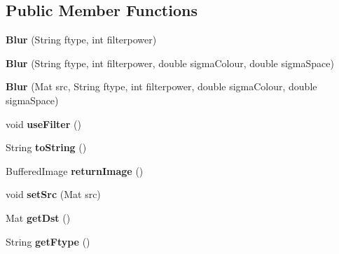 \subsection*{Public Member Functions}
\begin{DoxyCompactItemize}
\item 
\mbox{\label{classapplication_1_1_blur_a11b7920603463fd30f12618d1022caaa}} 
{\bfseries Blur} (String ftype, int filterpower)
\item 
\mbox{\label{classapplication_1_1_blur_afb919280e2244cf0336ab4a07ee847f6}} 
{\bfseries Blur} (String ftype, int filterpower, double sigma\+Colour, double sigma\+Space)
\item 
\mbox{\label{classapplication_1_1_blur_aaff487804568cdfa1f42b3427ecbec14}} 
{\bfseries Blur} (Mat src, String ftype, int filterpower, double sigma\+Colour, double sigma\+Space)
\item 
\mbox{\label{classapplication_1_1_blur_aae56105de62ef267d249903178237592}} 
void {\bfseries use\+Filter} ()
\item 
\mbox{\label{classapplication_1_1_blur_a73c1dba26db59f9cb006c13b843146c1}} 
String {\bfseries to\+String} ()
\item 
\mbox{\label{classapplication_1_1_blur_ae21240e5551b397eb32ccf136bb851b5}} 
Buffered\+Image {\bfseries return\+Image} ()
\item 
\mbox{\label{classapplication_1_1_blur_a8c8b3cadaf7c42b4fdc15080af7fb4d8}} 
void {\bfseries set\+Src} (Mat src)
\item 
\mbox{\label{classapplication_1_1_blur_ab1533310fb2826fb7ca663e10937101f}} 
Mat {\bfseries get\+Dst} ()
\item 
\mbox{\label{classapplication_1_1_blur_ae17dd6e4aea39a1d7b7b027f597a7f2b}} 
String {\bfseries get\+Ftype} ()
\item 
\mbox{\label{classapplication_1_1_blur_ac1eb14c472923aa1e228f9b7da5e0723}} 

\end{DoxyCompactItemize}
